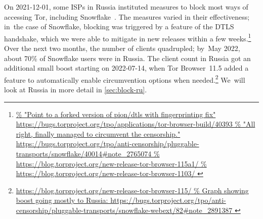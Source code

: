 \documentclass[letterpaper,twocolumn]{article}
\newlength{\urlfootnotesize}
\newcommand{\urlfootnote}[1]{\footnote{
\raggedright\hangindent\footnotemargin%
\fontsize{\urlfootnotesize}{\urlfootnotesize}\selectfont%
\url{#1}
}}
\begin{document}
On \mbox{2021-12-01}, some ISPs in Russia
instituted measures to block
most ways of accessing Tor,
including Snowflake~\cite{ooni-2021-russia-blocks-tor}.
The measures varied in their effectiveness;
in~the case of Snowflake,
blocking was triggered by a feature of the DTLS handshake,
which we were able to mitigate in new releases within a few weeks.\urlfootnote{
https://bugs.torproject.org/tpo/applications/tor-browser-build/40393
}
Over the next two months, the number of clients quadrupled;
by~May 2022,
about 70\% of Snowflake users were in Russia.
The client count in Russia got an additional small boost
starting on \mbox{2022-07-14},
when Tor Browser~11.5 added a feature
to automatically enable circumvention options when needed.\urlfootnote{
https://blog.torproject.org/new-release-tor-browser-115/
}
We~will look at Russia in more detail in \autoref{sec:block-ru}.
\end{document}
